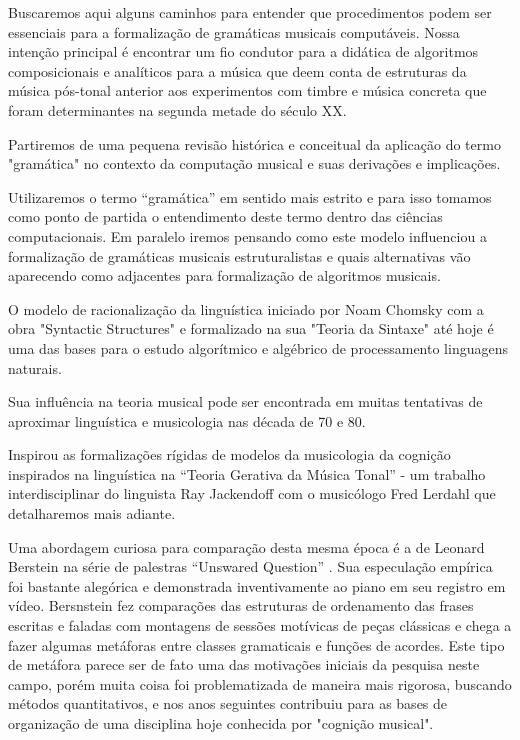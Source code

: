 \documentclass[
	12pt,				%
	openright,			%
	twoside,			%
	a4paper,			%
	english,			%
	french,				%
	spanish,			%
	brazil				%
	]{abntex2}
\begin{document}
Buscaremos aqui alguns caminhos para entender que procedimentos podem ser essenciais para a formalização de gramáticas musicais computáveis. Nossa intenção principal é encontrar um fio condutor para a didática de algoritmos composicionais e analíticos para a música que deem conta de estruturas da música pós-tonal anterior aos experimentos com timbre e música concreta que foram determinantes na segunda metade do século XX.  

Partiremos de uma pequena revisão histórica e conceitual da aplicação do termo "gramática" no contexto da computação musical e suas derivações e implicações.  

Utilizaremos o termo “gramática” em sentido mais estrito e para isso tomamos como ponto de partida o entendimento deste termo dentro das ciências computacionais. Em paralelo iremos pensando como este modelo influenciou a formalização de gramáticas musicais estruturalistas e quais alternativas vão aparecendo como adjacentes para formalização de algoritmos musicais.

O modelo de racionalização da linguística iniciado por Noam Chomsky com a obra "Syntactic Structures" \cite{chomsky1957syntactic} e formalizado na sua "Teoria da Sintaxe"\cite{chomsky1965aspects}  até hoje é uma das bases para o estudo algorítmico e algébrico de processamento linguagens naturais.  

Sua influência na teoria musical pode ser encontrada em muitas tentativas de aproximar linguística e musicologia nas década de 70 e 80.

Inspirou as formalizações rígidas de modelos da musicologia da cognição inspirados na linguística na “Teoria Gerativa da Música Tonal” \cite{lerdahl1983generative} - um trabalho interdisciplinar do linguista Ray Jackendoff com o musicólogo Fred Lerdahl que detalharemos mais adiante.

Uma abordagem curiosa para comparação desta mesma época é a de Leonard Berstein na série de palestras “Unswared Question” \cite{bernstein1976unanswered}. Sua especulação empírica foi bastante alegórica e demonstrada inventivamente ao piano em seu registro em vídeo. Bersnstein fez comparações das estruturas de ordenamento das frases escritas e faladas com montagens de sessões motívicas de peças clássicas e chega a fazer algumas metáforas entre classes gramaticais e funções de acordes. Este tipo de metáfora parece ser de fato uma das motivações iniciais da pesquisa neste campo, porém muita coisa foi problematizada de maneira mais rigorosa, buscando métodos quantitativos, e nos anos seguintes contribuiu para as bases de organização de uma disciplina hoje conhecida por "cognição musical".
\end{document}
